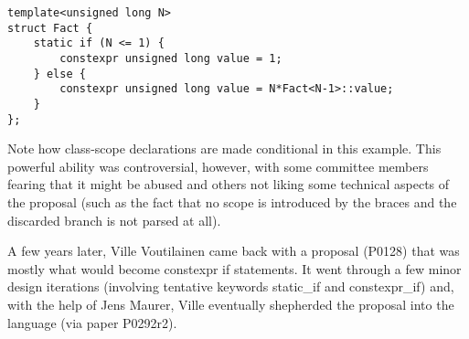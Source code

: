 \begin{lstlisting}[style=styleCXX]
template<unsigned long N>
struct Fact {
	static if (N <= 1) {
		constexpr unsigned long value = 1;
	} else {
		constexpr unsigned long value = N*Fact<N-1>::value;
	}
};
\end{lstlisting}

Note how class-scope declarations are made conditional in this example. This powerful ability was controversial, however, with some committee members fearing that it might be abused and others not liking some technical aspects of the proposal (such as the fact that no scope is introduced by the braces and the discarded branch is not parsed at all).

A few years later, Ville Voutilainen came back with a proposal (P0128) that was mostly what would become constexpr if statements. It went through a few minor design iterations (involving tentative keywords static\_if and constexpr\_if) and, with the help of Jens Maurer, Ville eventually shepherded the proposal into the language (via paper P0292r2).



